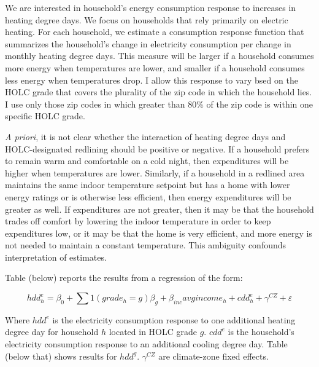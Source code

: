 \documentclass[
]{article}
\begin{document}
We are interested in household's energy consumption response to
increases in heating degree days. We focus on households that rely
primarily on electric heating. For each household, we estimate a
consumption response function that summarizes the household's change in
electricity consumption per change in monthly heating degree days. This
measure will be larger if a household consumes more energy when
temperatures are lower, and smaller if a household consumes less energy
when temperatures drop. I allow this response to vary bsed on the HOLC
grade that covers the plurality of the zip code in which the household
lies. I use only those zip codes in which greater than 80\% of the zip
code is within one specific HOLC grade.

\emph{A priori}, it is not clear whether the interaction of heating
degree days and HOLC-designated redlining should be positive or
negative. If a household prefers to remain warm and comfortable on a
cold night, then expenditures will be higher when temperatures are
lower. Similarly, if a household in a redlined area maintains the same
indoor temperature setpoint but has a home with lower energy ratings or
is otherwise less efficient, then energy expenditures will be greater as
well. If expenditures are not greater, then it may be that the household
trades off comfort by lowering the indoor temperature in order to keep
expenditures low, or it may be that the home is very efficient, and more
energy is not needed to maintain a constant temperature. This ambiguity
confounds interpretation of estimates.

Table (below) reports the results from a regression of the form:

\[hdd^e_h = \beta_0 + \sum 1(grade_h=g)\beta_g + \beta_{inc} avgincome_h + cdd^e_h + \gamma^{CZ} + \varepsilon\]

Where \(hdd^e\) is the electricity consumption response to one
additional heating degree day for household \(h\) located in HOLC grade
\(g\). \(cdd^e\) is the household's electricity consumption response to
an additional cooling degree day. Table (below that) shows results for
\(hdd^g\). \(\gamma^{CZ}\) are climate-zone fixed effects.
\end{document}
